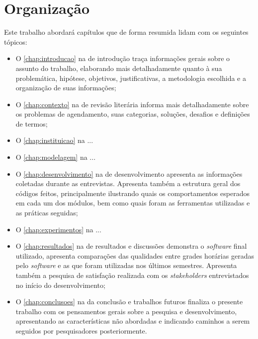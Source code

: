 \section{Organização} %

Este trabalho abordará capítulos que de forma resumida lidam com os seguintes tópicos:

\begin{itemize}
  \item O \autoref{chap:introducao} na  de introdução traça informações gerais sobre o assunto do trabalho, elaborando mais detalhadamente quanto à sua problemática, hipótese, objetivos, justificativas, a metodologia escolhida e a organização de suas informações;
  \item O \autoref{chap:contexto} na  de revisão literária informa mais detalhadamente sobre os problemas de agendamento, suas categorias, soluções, desafios e definições de termos;
  \item O \autoref{chap:instituicao} na ...
  \item O \autoref{chap:modelagem} na ...
  \item O \autoref{chap:desenvolvimento} na  de desenvolvimento apresenta as informações coletadas durante as entrevistas. Apresenta também a estrutura geral dos códigos feitos, principalmente ilustrando quais os comportamentos esperados em cada um dos módulos, bem como quais foram as ferramentas utilizadas e as práticas seguidas;
  \item O \autoref{chap:experimentos} na ...
  \item O \autoref{chap:resultados} na  de resultados e discussões demonstra o \textit{software} final utilizado, apresenta comparações das qualidades entre grades horárias geradas pelo \textit{software} e as que foram utilizadas nos últimos semestres. Apresenta também a pesquisa de satisfação realizada com os \textit{stakeholders} entrevistados no início do desenvolvimento;
  \item O \autoref{chap:conclusoes} na  da conclusão e trabalhos futuros finaliza o presente trabalho com os pensamentos gerais sobre a pesquisa e desenvolvimento, apresentando as características não abordadas e indicando caminhos a serem seguidos por pesquisadores posteriormente.
\end{itemize}
